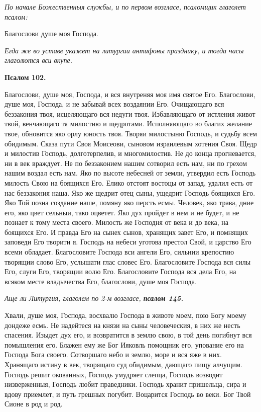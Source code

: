 \itshape По начале Божественныя службы, и по первом возгласе, псаломщик глаголет псалом:\normalfont{}


Благослови душе моя Господа. 

\itshape Егда же во уставе укажет на литургии антифоны празднику, и тогда часы глаголются вси вкупе.\normalfont{}


\medskip


\bfseries Псалом 102.\normalfont{}\nopagebreak


Благослови, душе моя, Господа, и вся внутреняя моя имя святое Его. Благослови, душе моя, Господа, и не забывай всех воздаянии Его. Очищающаго вся беззакония твоя, исцеляющаго вся недуги твоя. Избавляющаго от истления живот твой, венчающаго тя милостию и щедротами. Исполняющаго во благих желание твое, обновится яко орлу юность твоя. Творяи милостыню Господь, и судьбу всем обидимым. Сказа пути Своя Моисеови, сыновом израилевым хотения Своя. Щедр и милостив Господь, долготерпелив, и многомилостив. Не до конца прогневается, ни в век враждует. Не по беззаконием нашим сотворил есть нам, ни по грехом нашим воздал есть нам. Яко по высоте небесней от земли, утвердил есть Господь милость Свою на боящихся Его. Елико отстоят востоцы от запад, удалил есть от нас беззакония наша. Яко же щедрит отец сыны, ущедрит Господь боящихся Его. Яко Той позна создание наше, помяну яко персть есмы. Человек, яко трава, дние его, яко цвет сельныи, тако оцветет. Яко дух пройдет в нем и не будет, и не познает к тому места своего. Милость же Господня от века и до века, на боящихся Его. И правда Его на сынех сынов, хранящих завет Его, и помнящих заповеди Его творити я. Господь на небеси уготова престол Свой, и царство Его всеми обладает. Благословите Господа вси ангели Его, сильнии крепостию творящии слово Его, услышати глас словес Его. Благословите Господа вся силы Его, слуги Его, творящии волю Его. Благословите Господа вся дела Его, на всяком месте владычества Его, благослови, душе моя Господа.


\medskip


\itshape Аще ли Литургия, глаголем по 2-м возгласе, \bfseries псалом 145\normalfont{}.\normalfont{}


Хвали, душе моя, Господа, восхвалю Господа в животе моем, пою Богу моему дондеже есмь. Не надейтеся на князи на сыны человеческия, в них же несть спасения. Изыдет дух его, и возвратится в землю свою, в той день погибнут вся помышления его. Блажен ему же Бог Ияковль помощник его, упование его на Господа Бога своего. Сотворшаго небо и землю, море и вся яже в них. Хранящаго истину в век, творящаго суд обидимым, дающаго пищу алчущим. Господь решит окованных, Господь умудряет слепца, Господь возводит низверженныя, Господь любит праведники. Господь хранит пришельца, сира и вдову приемлет, и путь грешных погубит. Воцарится Господь во веки. Бог Твой Сионе в род и род. 

